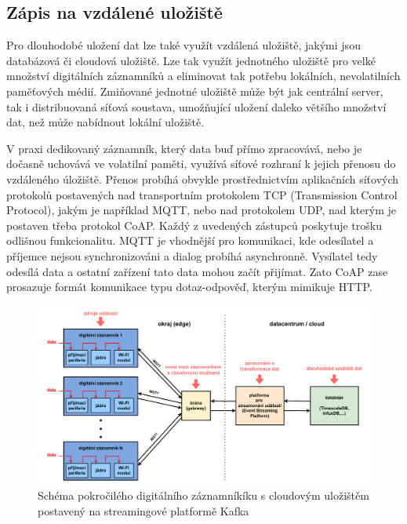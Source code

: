 \subsection{Zápis na vzdálené uložiště}
\label{zapis_na_vzdalene_uloziste}
Pro dlouhodobé uložení dat lze také využít vzdálená uložiště, jakými jsou databázová či cloudová uložiště. Lze tak využít jednotného uložiště pro velké množství digitálních záznamníků a eliminovat tak potřebu lokálních, nevolatilních paměťových médií. Zmiňované jednotné uložiště může být jak centrální server, tak i distribuovaná síťová soustava, umožňující uložení daleko většího množství dat, než může nabídnout lokální uložiště.

V praxi dedikovaný záznamník, který data buď přímo zpracovává, nebo je dočasně uchovává ve volatilní paměti, využívá síťové rozhraní k jejich přenosu do vzdáleného úložiště. Přenos probíhá obvykle prostřednictvím aplikačních síťových protokolů postavených nad transportním protokolem TCP (Transmission Control Protocol), jakým je například MQTT, nebo nad protokolem UDP, nad kterým je postaven třeba protokol CoAP. Každý z uvedených zástupců poskytuje trošku odlišnou funkcionalitu. MQTT je vhodnější pro komunikaci, kde odesílatel a příjemce nejsou synchronizováni a dialog probíhá asynchronně. Vysílatel tedy odesílá data a ostatní zařízení tato data mohou začít přijímat. Zato CoAP zase prosazuje formát komunikace typu dotaz-odpověď, kterým mimikuje HTTP. \cite{emq_mqtt_vs_coap}


\begin{figure}[h]
    \centering
    \includegraphics[width=1.00\textwidth]{obrazky-figures/advanced_architecture_of_datalogging.pdf}
    
    \caption{Schéma pokročilého digitálního záznamníkíku s cloudovým uložištěm postavený na streamingové platformě Kafka \cite{confluent_advanced_datalogging, influxdata_advanced_datalogging_mmqt}}
    \label{fig:advanced-architecture-of-datalogging}
\end{figure}

